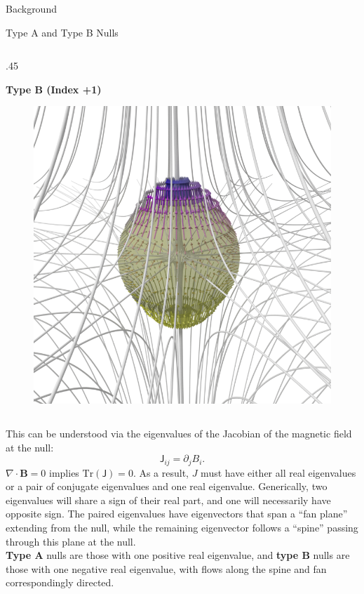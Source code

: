 \documentclass[final]{beamer}
\newlength{\onecolwid}
\begin{document}
\begin{frame}[t]
\begin{columns}[t]
\begin{column}{\onecolwid}
\begin{block}{\huge{Background}}
\begin{block}{Type A and Type B Nulls}
\begin{columns}[t,totalwidth=\onecolwid]
    \begin{column}{.45\onecolwid}
        \begin{centering}
        \textbf{Type B (Index +1)}
        \begin{figure}
        \includegraphics[width=.45\onecolwid]{fig/posindex_start.png}
        \end{figure}
    \end{centering}
    \end{column}
  \end{columns}
  
    \vspace{10pt}
    This can be understood via the eigenvalues of the Jacobian of the magnetic field at the null:
    \begin{equation}\label{eq:matrix}
        \mathsf{J}_{ij}= \partial_j B_i.
    \end{equation}
    $\nabla\cdot\mathbf{B}=0$ implies $\mathrm{Tr}(\mathsf{J})=0$. As a result, $J$ must have either all real
    eigenvalues or a pair of conjugate eigenvalues and one real eigenvalue.
    Generically, two eigenvalues will share a sign of their real part,
    and one will necessarily have opposite sign. The paired eigenvalues have eigenvectors
    that span a ``fan plane'' extending from the null,
    while the remaining eigenvector follows a ``spine'' passing through this plane at the null.\\
    \textbf{Type A} nulls are those with one positive real eigenvalue,
    and \textbf{type B} nulls are those with one negative real eigenvalue,
    with flows along the spine and fan correspondingly directed.
\end{block}


\end{block}
\end{column}
\end{columns}
\end{frame}
\end{document}
